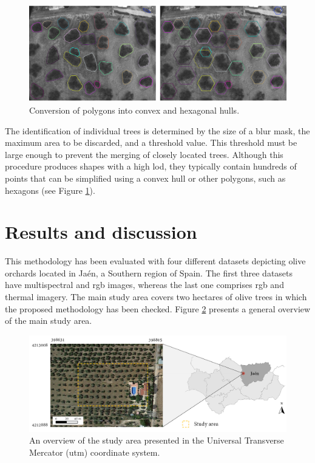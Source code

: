 \begin{figure}[hbp]
    \centering
    \includegraphics[width=1\linewidth]{figs/image_fusion/convex_hull_contours.png}
    \caption{Conversion of polygons into convex and hexagonal hulls.}
    \label{fig:convex_hull_contours}
\end{figure}

The identification of individual trees is determined by the size of a blur mask, the maximum area to be discarded, and a threshold value. This threshold must be large enough to prevent the merging of closely located trees. Although this procedure produces shapes with a high \acrshort{lod}, they typically contain hundreds of points that can be simplified using a convex hull \cite{sklansky_finding_1982} or other polygons, such as hexagons (see Figure \ref{fig:convex_hull_contours}).

\section{Results and discussion}
\label{sec:image_fusion_evaluation}

This methodology has been evaluated with four different datasets depicting olive orchards located in Jaén, a Southern region of Spain. The first three datasets have multispectral and \acrshort{rgb} images, whereas the last one comprises \acrshort{rgb} and thermal imagery. The main study area covers two hectares of olive trees in which the proposed methodology has been checked. Figure \ref{fig:image_fusion_study_area} presents a general overview of the main study area.

\begin{figure}[htb]
    \centering
    \includegraphics[width=\linewidth]{figs/image_fusion/study_area.png}
    \caption{An overview of the study area presented in the Universal Transverse Mercator (\acrshort{utm}) coordinate system.}
    \label{fig:image_fusion_study_area}
\end{figure}

